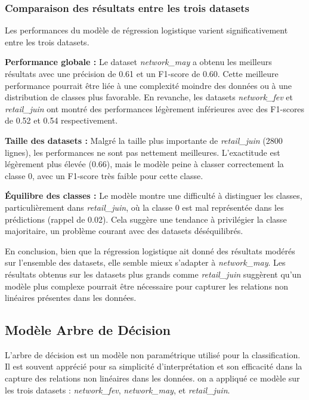 \subsubsection{Comparaison des résultats entre les trois datasets}

Les performances du modèle de régression logistique varient significativement entre les trois datasets.

\textbf{Performance globale :} Le dataset \textit{network\_may} a obtenu les meilleurs résultats avec une précision de 0.61 et un F1-score de 0.60. Cette meilleure performance pourrait être liée à une complexité moindre des données ou à une distribution de classes plus favorable. En revanche, les datasets \textit{network\_fev} et \textit{retail\_juin} ont montré des performances légèrement inférieures avec des F1-scores de 0.52 et 0.54 respectivement.

\textbf{Taille des datasets :} Malgré la taille plus importante de \textit{retail\_juin} (2800 lignes), les performances ne sont pas nettement meilleures. L'exactitude est légèrement plus élevée (0.66), mais le modèle peine à classer correctement la classe 0, avec un F1-score très faible pour cette classe.

\textbf{Équilibre des classes :} Le modèle montre une difficulté à distinguer les classes, particulièrement dans \textit{retail\_juin}, où la classe 0 est mal représentée dans les prédictions (rappel de 0.02). Cela suggère une tendance à privilégier la classe majoritaire, un problème courant avec des datasets déséquilibrés.

En conclusion, bien que la régression logistique ait donné des résultats modérés sur l'ensemble des datasets, elle semble mieux s'adapter à \textit{network\_may}. Les résultats obtenus sur les datasets plus grands comme \textit{retail\_juin} suggèrent qu'un modèle plus complexe pourrait être nécessaire pour capturer les relations non linéaires présentes dans les données.

\subsection{Modèle Arbre de Décision}

L'arbre de décision est un modèle non paramétrique utilisé pour la classification. Il est souvent apprécié pour sa simplicité d'interprétation et son efficacité dans la capture des relations non linéaires dans les données. on a appliqué ce modèle sur les trois datasets : \textit{network\_fev}, \textit{network\_may}, et \textit{retail\_juin}.

